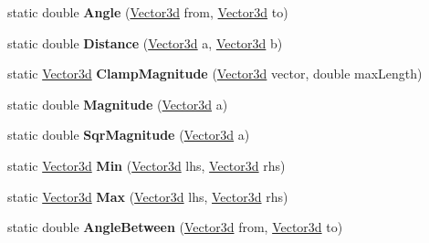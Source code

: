 \begin{DoxyCompactItemize}
static double {\bfseries Angle} (\hyperlink{struct_unity_engine_1_1_vector3d}{Vector3d} from, \hyperlink{struct_unity_engine_1_1_vector3d}{Vector3d} to)
\item 
\mbox{\label{struct_unity_engine_1_1_vector3d_a26384a77846e070e38446963b2fb2729}} 
static double {\bfseries Distance} (\hyperlink{struct_unity_engine_1_1_vector3d}{Vector3d} a, \hyperlink{struct_unity_engine_1_1_vector3d}{Vector3d} b)
\item 
\mbox{\label{struct_unity_engine_1_1_vector3d_a00aa99b9411480c0a046a946a842dbdb}} 
static \hyperlink{struct_unity_engine_1_1_vector3d}{Vector3d} {\bfseries Clamp\+Magnitude} (\hyperlink{struct_unity_engine_1_1_vector3d}{Vector3d} vector, double max\+Length)
\item 
\mbox{\label{struct_unity_engine_1_1_vector3d_a0512c73fb2df85212fa16f764f8df2e8}} 
static double {\bfseries Magnitude} (\hyperlink{struct_unity_engine_1_1_vector3d}{Vector3d} a)
\item 
\mbox{\label{struct_unity_engine_1_1_vector3d_a8cd9b037f522d8563af401f7e3b59e75}} 
static double {\bfseries Sqr\+Magnitude} (\hyperlink{struct_unity_engine_1_1_vector3d}{Vector3d} a)
\item 
\mbox{\label{struct_unity_engine_1_1_vector3d_ae4576ef2e5181d8c81df5e7c4af22dbc}} 
static \hyperlink{struct_unity_engine_1_1_vector3d}{Vector3d} {\bfseries Min} (\hyperlink{struct_unity_engine_1_1_vector3d}{Vector3d} lhs, \hyperlink{struct_unity_engine_1_1_vector3d}{Vector3d} rhs)
\item 
\mbox{\label{struct_unity_engine_1_1_vector3d_a5538dd876f4367f1111f47b01a8099ef}} 
static \hyperlink{struct_unity_engine_1_1_vector3d}{Vector3d} {\bfseries Max} (\hyperlink{struct_unity_engine_1_1_vector3d}{Vector3d} lhs, \hyperlink{struct_unity_engine_1_1_vector3d}{Vector3d} rhs)
\item 
\mbox{\label{struct_unity_engine_1_1_vector3d_a73a3ff3b4a22da103d3eb4b7d4aec560}} 
static double {\bfseries Angle\+Between} (\hyperlink{struct_unity_engine_1_1_vector3d}{Vector3d} from, \hyperlink{struct_unity_engine_1_1_vector3d}{Vector3d} to)
\end{DoxyCompactItemize}
